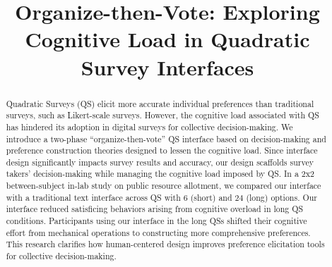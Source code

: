 \documentclass[manuscript, review, anonymous, natbib=false]{acmart}
\begin{document}

\title{Organize-then-Vote: Exploring Cognitive Load in Quadratic Survey Interfaces}











\renewcommand{\shortauthors}{Ti-Chung Cheng et al.}

\begin{abstract}
Quadratic Surveys (QS) elicit more accurate individual preferences than traditional surveys, such as Likert-scale surveys. However, the cognitive load associated with QS has hindered its adoption in digital surveys for collective decision-making. We introduce a two-phase ``organize-then-vote'' QS interface based on decision-making and preference construction theories designed to lessen the cognitive load. Since interface design significantly impacts survey results and accuracy, our design scaffolds survey takers' decision-making while managing the cognitive load imposed by QS. In a 2x2 between-subject in-lab study on public resource allotment, we compared our interface with a traditional text interface across QS with $6$ (short) and $24$ (long) options. Our interface reduced satisficing behaviors arising from cognitive overload in long QS conditions. Participants using our interface in the long QSs shifted their cognitive effort from mechanical operations to constructing more comprehensive preferences. This research clarifies how human-centered design improves preference elicitation tools for collective decision-making.
\end{abstract}
\end{document}
